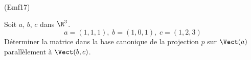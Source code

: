 \begin{tiny}(Emf17)\end{tiny} Soit $a$, $b$, $c$ dans $\R^3$.
\begin{displaymath}
 a=(1,1,1),\;b=(1,0,1),\;c=(1,2,3)
\end{displaymath}
Déterminer la matrice dans la base canonique de la projection $p$ sur $\Vect(a)$ parallèlement à $\Vect(b,c)$.